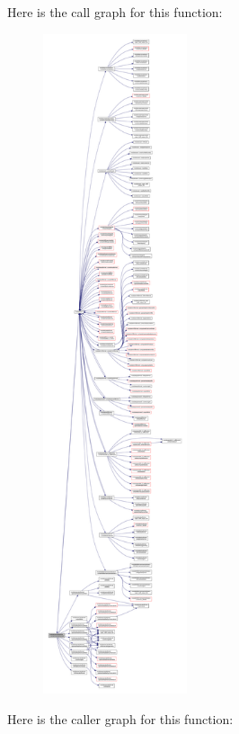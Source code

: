 Here is the call graph for this function\+:\nopagebreak
\begin{figure}[H]
\begin{center}
\leavevmode
\includegraphics[height=550pt]{namespacemodulemercatorformat_ab5fa5a32b4c60eb82b51453effd56cbf_cgraph}
\end{center}
\end{figure}
Here is the caller graph for this function\+:\nopagebreak
